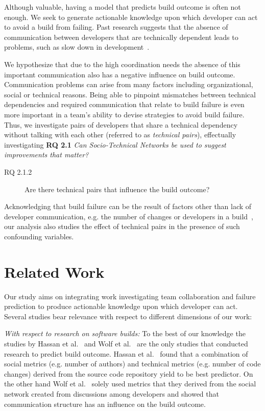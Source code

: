 Although valuable, having a model that predicts build outcome is often not
enough. We seek to generate actionable knowledge upon which developer can act to
avoid a build from failing. Past research suggests that the absence of
communication between developers that are technically dependent leads to
problems, such as slow down in development~\cite{cataldo:esem:2008}.


We hypothesize that due to the high coordination needs the absence of this
important communication also has a negative influence on build outcome. Communication problems can arise from many factors including organizational,
social or technical reasons. Being able to pinpoint
mismatches between technical dependencies and required communication that
relate to build failure is even more important in a team's
ability to devise strategies to avoid build failure. Thus, we
investigate pairs of developers that share a technical dependency without talking
with each other (referred to as \emph{technical pairs}), effectually investigating \textbf{RQ 2.1} \emph{Can Socio-Technical Networks be used to suggest improvements that matter?}


\begin{description}
\item[RQ 2.1.2] Are there technical pairs that influence the build outcome?
\end{description}

Acknowledging that build failure can be the result
of factors other than lack of developer
communication, e.g. the number of changes or developers in a build~\cite{hassan:ase:2006}, our
analysis also studies the effect of technical pairs in the presence of such
confounding variables. 







\section{Related Work}
\label{sec:relwork}
Our study aims on integrating work investigating team collaboration and failure prediction to produce actionable knowledge upon which developer can act.
Several studies bear relevance with respect to different dimensions of our work:

\emph{With respect to research on software builds:}
To the best of our knowledge the studies by Hassan et al.~\cite{hassan:ase:2006}
and Wolf et al.~\cite{wolf:icse:2009} are the only studies that conducted
research to predict build outcome. Hassan et al.~\cite{hassan:ase:2006} found
that a combination of social metrics (e.g. number of authors) and technical
metrics (e.g. number of code changes) derived from the source code repository
yield to be best predictor. On the other hand Wolf et al.~\cite{wolf:icse:2009}
solely used metrics that they derived from the social network created from
discussions among developers and showed that communication structure has an
influence on the build outcome.

